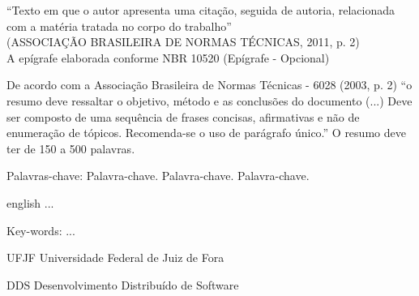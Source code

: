\documentclass[
        12pt,
        openany, %
        oneside, %
        a4paper,
        english,
        brazil			        %
        ]{abntbibufjf}
\begin{document}
\begin{epigrafe}
    \vspace*{\fill}
	\begin{flushright}
		``Texto em que o autor apresenta uma cita\c{c}\~ao, seguida de autoria, relacionada com a
  mat\'eria tratada no corpo do trabalho'' \\
(ASSOCIA\c{C}\~AO BRASILEIRA DE NORMAS T\'ECNICAS, 2011, p. 2) \\
  A ep\'igrafe elaborada conforme NBR 10520 (Ep\'igrafe - Opcional)
	\end{flushright}
\end{epigrafe}



\setlength{\absparsep}{18pt}
\begin{resumo}
De acordo com a Associa\c{c}\~ao Brasileira de Normas T\'ecnicas - 6028 (2003, p. 2) ``o resumo deve ressaltar
o objetivo, m\'etodo e as conclus\~oes do documento (...) Deve ser composto de uma sequ\^encia de frases
concisas, afirmativas e n\~ao de enumera\c{c}\~ao de t\'opicos. Recomenda-se o uso de par\'agrafo \'unico.''
O resumo deve ter de 150 a 500 palavras.

Palavras-chave: Palavra-chave. Palavra-chave. Palavra-chave. %

\end{resumo}


\begin{resumo}[ABSTRACT]
 \begin{otherlanguage*}{english}
   ...

Key-words: ...
 \end{otherlanguage*}
\end{resumo}


\listoffigures*
\cleardoublepage



\begin{siglas} %
  \item[UFJF] Universidade Federal de Juiz de Fora
  \item[DDS]  Desenvolvimento Distribuído de Software
\end{siglas}
\end{document}
